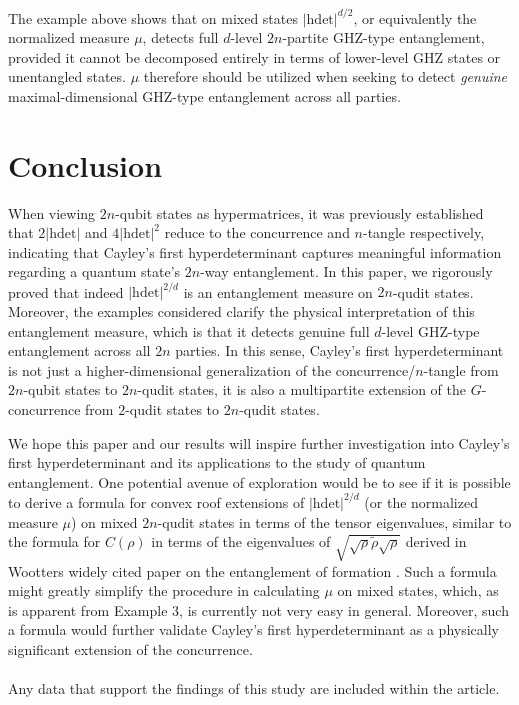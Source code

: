 \documentclass{article}
\begin{document}
The example above shows that on mixed states $|\mathrm{hdet}|^{d/2}$, or equivalently the normalized measure $\mu$, detects full $d$-level $2n$-partite GHZ-type entanglement, provided it cannot be decomposed entirely in terms of lower-level GHZ states or unentangled states. $\mu$ therefore should be utilized when seeking to detect \textit{genuine} maximal-dimensional GHZ-type entanglement across all parties. 

\section{Conclusion}
When viewing $2n$-qubit states as hypermatrices, it was previously established that $2|\mathrm{hdet}|$ and $4|\mathrm{hdet}|^2$ reduce to the concurrence and $n$-tangle respectively, indicating that Cayley's first hyperdeterminant captures meaningful information regarding a quantum state's $2n$-way entanglement. In this paper, we rigorously proved that indeed $|\mathrm{hdet}|^{2/d}$ is an entanglement measure on $2n$-qudit states. Moreover, the examples considered clarify the physical interpretation of this entanglement measure, which is that it detects genuine full $d$-level GHZ-type entanglement across all $2n$ parties. In this sense, Cayley's first hyperdeterminant is not just a higher-dimensional generalization of the concurrence/$n$-tangle from $2n$-qubit states to $2n$-qudit states, it is also a multipartite extension of the $G$-concurrence from $2$-qudit states to $2n$-qudit states. 

We hope this paper and our results will inspire further investigation into Cayley's first hyperdeterminant and its applications to the study of quantum entanglement. One potential avenue of exploration would be to see if it is possible to derive a formula for convex roof extensions of $|\mathrm{hdet}|^{2/d}$ (or the normalized measure $\mu$) on mixed $2n$-qudit states in terms of the tensor eigenvalues, similar to the formula for $C(\rho)$ in terms of the eigenvalues of $\sqrt{\sqrt{\rho}\widetilde{\rho}\sqrt{\rho}}$ derived in Wootters widely cited paper on the entanglement of formation \cite{wootters1998entanglement}. Such a formula might greatly simplify the procedure in calculating $\mu$ on mixed states, which, as is apparent from Example 3, is currently not very easy in general. Moreover, such a formula would further validate Cayley's first hyperdeterminant as a physically significant extension of the concurrence.  
\\
\\
Any data that support the findings of this study are included within the article.




\end{document}
